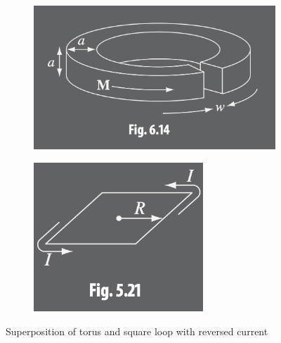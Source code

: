 \documentclass[../main.tex]{subfiles}
\begin{document}
\newpage
\begin{figure}[ht]
    \centering
    \begin{subfigure}{0.45\textwidth}
        \centering
        \includegraphics[width=\textwidth]{hw10_3.png}
    \end{subfigure}
    \hfill
    \begin{subfigure}{0.45\textwidth}
        \centering
        \includegraphics[width=0.7\textwidth]{hw10_4.png}
    \end{subfigure}
    \caption{Superposition of torus and square loop with reversed current}
    \label{fig:hw10_3}
\end{figure}
\end{document}
